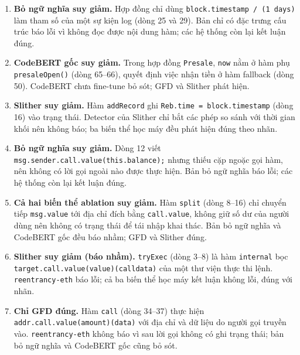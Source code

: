 \documentclass[12pt,a4paper]{article}
\newcommand{\code}[1]{\texttt{#1}}
\begin{document}
\begin{enumerate}
\item \textbf{Bỏ ngữ nghĩa suy giảm.} Hợp đồng chỉ dùng \code{block.timestamp / (1 days)} làm tham số của một sự kiện log (dòng 25 và 29). Bản chỉ có đặc trưng cấu trúc báo lỗi vì không đọc được nội dung hàm; các hệ thống còn lại kết luận đúng.
\item \textbf{CodeBERT gốc suy giảm.} Trong hợp đồng \code{Presale}, \code{now} nằm ở hàm phụ \code{presaleOpen()} (dòng 65--66), quyết định việc nhận tiền ở hàm fallback (dòng 50). CodeBERT chưa fine-tune bỏ sót; GFD và Slither phát hiện.
\item \textbf{Slither suy giảm.} Hàm \code{addRecord} ghi \code{Reb.time = block.timestamp} (dòng 16) vào trạng thái. Detector của Slither chỉ bắt các phép so sánh với thời gian khối nên không báo; ba biến thể học máy đều phát hiện đúng theo nhãn.
\item \textbf{Bỏ ngữ nghĩa suy giảm.} Dòng 12 viết \code{msg.sender.call.value(this.balance);} nhưng thiếu cặp ngoặc gọi hàm, nên không có lời gọi ngoài nào được thực hiện. Bản bỏ ngữ nghĩa báo lỗi; các hệ thống còn lại kết luận đúng.
\item \textbf{Cả hai biến thể ablation suy giảm.} Hàm \code{split} (dòng 8--16) chỉ chuyển tiếp \code{msg.value} tới địa chỉ đích bằng \code{call.value}, không giữ số dư của người dùng nên không có trạng thái để tái nhập khai thác. Bản bỏ ngữ nghĩa và CodeBERT gốc đều báo nhầm; GFD và Slither đúng.
\item \textbf{Slither suy giảm (báo nhầm).} \code{tryExec} (dòng 3--8) là hàm \code{internal} bọc \code{target.call.value(value)(calldata)} của một thư viện thực thi lệnh. \code{reentrancy-eth} báo lỗi; cả ba biến thể học máy kết luận không lỗi, đúng với nhãn.
\item \textbf{Chỉ GFD đúng.} Hàm \code{call} (dòng 34--37) thực hiện \code{addr.call.value(amount)(data)} với địa chỉ và dữ liệu do người gọi truyền vào. \code{reentrancy-eth} không báo vì sau lời gọi không có ghi trạng thái; bản bỏ ngữ nghĩa và CodeBERT gốc cũng bỏ sót.
\end{enumerate}
\end{document}
